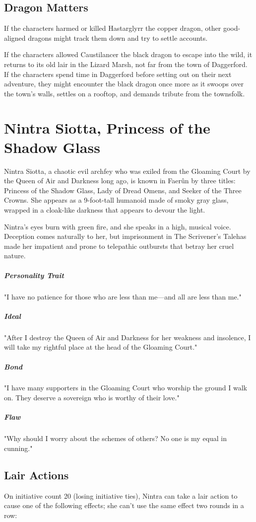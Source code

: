 \documentclass[10pt,a4paper,twoside,bg=print,twocolumn,openany,nodeprecatedcode]{dndbook}
\begin{document}
\subsection{Dragon Matters}
If the characters harmed or killed Hastarglyrr the copper dragon, other good-aligned dragons might track them down and try to settle accounts.

If the characters allowed Caustilancer the black dragon to escape into the wild, it returns to its old lair in the Lizard Marsh, not far from the town of Daggerford. If the characters spend time in Daggerford before setting out on their next adventure, they might encounter the black dragon once more as it swoops over the town's walls, settles on a rooftop, and demands tribute from the townsfolk.

\section{Nintra Siotta, Princess of the Shadow Glass}
Nintra Siotta, a chaotic evil archfey who was exiled from the Gloaming Court by the Queen of Air and Darkness long ago, is known in Faerûn by three titles: Princess of the Shadow Glass, Lady of Dread Omens, and Seeker of the Three Crowns. She appears as a 9-foot-tall humanoid made of smoky gray glass, wrapped in a cloak-like darkness that appears to devour the light.

Nintra's eyes burn with green fire, and she speaks in a high, musical voice. Deception comes naturally to her, but imprisonment in The Scrivener's Talehas made her impatient and prone to telepathic outbursts that betray her cruel nature.

\subparagraph{Personality Trait}
"I have no patience for those who are less than me—and all are less than me."

\subparagraph{Ideal}
"After I destroy the Queen of Air and Darkness for her weakness and insolence, I will take my rightful place at the head of the Gloaming Court."

\subparagraph{Bond}
"I have many supporters in the Gloaming Court who worship the ground I walk on. They deserve a sovereign who is worthy of their love."

\subparagraph{Flaw}
"Why should I worry about the schemes of others? No one is my equal in cunning."

\subsection{Lair Actions}
On initiative count 20 (losing initiative ties), Nintra can take a lair action to cause one of the following effects; she can't use the same effect two rounds in a row:
\end{document}
